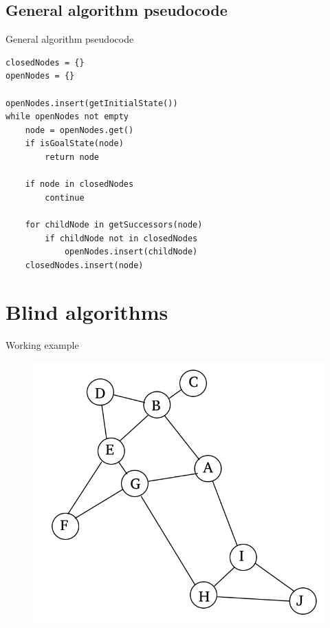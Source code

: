 \documentclass{beamer}
\begin{document}
\subsection{General algorithm pseudocode}

\begin{frame}[fragile]{General algorithm pseudocode}
	\begin{lstlisting}
closedNodes = {}
openNodes = {}

openNodes.insert(getInitialState())
while openNodes not empty 
	node = openNodes.get()
	if isGoalState(node)
		return node
		
	if node in closedNodes
		continue
		
	for childNode in getSuccessors(node)
		if childNode not in closedNodes
			openNodes.insert(childNode)
	closedNodes.insert(node)
	\end{lstlisting}
\end{frame}

\section{Blind algorithms}

\begin{frame}{Working example}

	\begin{figure}
	\centering
		\includegraphics[width=0.8\linewidth]{example.jpg}
	\end{figure}

\end{frame}
\end{document}
